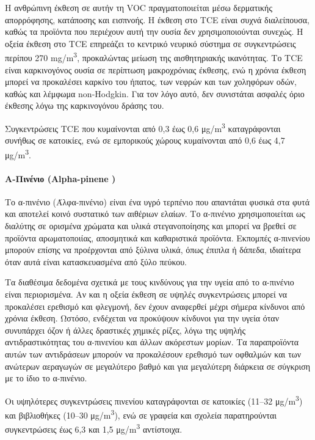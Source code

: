 Η ανθρώπινη έκθεση σε αυτήν τη VOC πραγματοποιείται μέσω δερματικής απορρόφησης, κατάποσης και εισπνοής. 
Η έκθεση στο TCE είναι συχνά διαλείπουσα, καθώς τα προϊόντα που περιέχουν αυτή την ουσία δεν χρησιμοποιούνται συνεχώς. Η οξεία έκθεση στο TCE επηρεάζει το κεντρικό νευρικό σύστημα σε συγκεντρώσεις περίπου 270 mg/m\textsuperscript{3},
 προκαλώντας μείωση της αισθητηριακής ικανότητας. Το TCE είναι καρκινογόνος ουσία σε περίπτωση μακροχρόνιας έκθεσης, ενώ η χρόνια έκθεση μπορεί να προκαλέσει καρκίνο του ήπατος, των νεφρών και των χοληφόρων οδών, καθώς και λέμφωμα non-Hodgkin.
Για τον λόγο αυτό, δεν συνιστάται ασφαλές όριο έκθεσης λόγω της καρκινογόνου δράσης του.

Συγκεντρώσεις TCE που κυμαίνονται από 0,3 έως 0,6 μg/m\textsuperscript{3} καταγράφονται συνήθως σε κατοικίες, ενώ σε εμπορικούς χώρους κυμαίνονται από 0,6 έως 4,7 μg/m\textsuperscript{3}.

\paragraph{Α-Πινένιο (Alpha-pinene )}

Το α-πινένιο (Άλφα-πινένιο) είναι ένα υγρό τερπένιο που απαντάται φυσικά στα φυτά και αποτελεί κοινό συστατικό των αιθέριων ελαίων. 
Το α-πινένιο χρησιμοποιείται ως διαλύτης σε ορισμένα χρώματα και υλικά στεγανοποίησης και μπορεί να βρεθεί σε προϊόντα αρωματοποιίας, αποσμητικά και καθαριστικά προϊόντα. 
Εκπομπές  α-πινενίου μπορούν επίσης να προέρχονται από ξύλινα υλικά, όπως έπιπλα ή δάπεδα, ιδιαίτερα όταν αυτά είναι κατασκευασμένα από ξύλο πεύκου.

Τα διαθέσιμα δεδομένα σχετικά με τους κινδύνους για την υγεία από το α-πινένιο είναι περιορισμένα. Αν και η οξεία έκθεση σε υψηλές συγκεντρώσεις μπορεί να προκαλέσει ερεθισμό και φλεγμονή, δεν έχουν αναφερθεί μέχρι σήμερα κίνδυνοι από χρόνια έκθεση.
Ωστόσο, ενδέχεται να προκύψουν κίνδυνοι για την υγεία όταν συνυπάρχει όζον ή άλλες δραστικές χημικές ρίζες, λόγω της υψηλής αντιδραστικότητας του  α-πινενίου και άλλων ακόρεστων μορίων. 
 Τα παραπροϊόντα αυτών των αντιδράσεων μπορούν να προκαλέσουν ερεθισμό των οφθαλμών και των ανώτερων αεραγωγών σε μεγαλύτερο βαθμό και για μεγαλύτερη διάρκεια σε σύγκριση με το ίδιο το α-πινένιο.

Οι υψηλότερες συγκεντρώσεις πινενίου καταγράφονται σε κατοικίες (11–32 μg/m\textsuperscript{3}) και βιβλιοθήκες (10–30 μg/m\textsuperscript{3}), ενώ σε γραφεία και σχολεία παρατηρούνται συγκεντρώσεις έως 6,3 και 1,5 μg/m\textsuperscript{3} αντίστοιχα.

